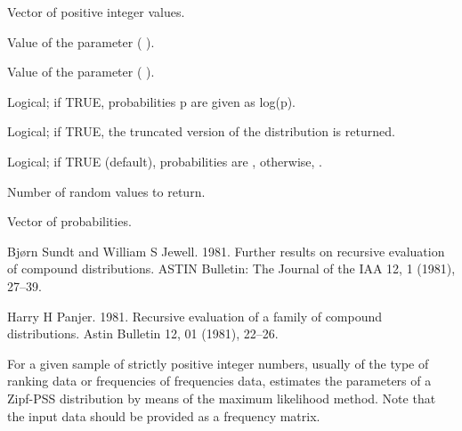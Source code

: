 \documentclass[letterpaper]{book}
\begin{document}
%
\begin{Arguments}
\begin{ldescription}
\item[\code{x, q}] Vector of positive integer values.

\item[\code{alpha}] Value of the \eqn{\alpha}{} parameter ( ).

\item[\code{lambda}] Value of the \eqn{\lambda}{} parameter ( ).

\item[\code{log, log.p}] Logical; if TRUE, probabilities p are given as log(p).

\item[\code{isTruncated}] Logical; if TRUE, the truncated version of the distribution is returned.

\item[\code{lower.tail}] Logical; if TRUE (default), probabilities are , otherwise, .

\item[\code{n}] Number of random values to return.

\item[\code{p}] Vector of probabilities.
\end{ldescription}
\end{Arguments}
%
\begin{References}\relax

Bjørn Sundt and William S Jewell. 1981. Further results on recursive evaluation of compound distributions. ASTIN
Bulletin: The Journal of the IAA 12, 1 (1981), 27–39.

Harry H Panjer. 1981. Recursive evaluation of a family of compound distributions. Astin Bulletin 12, 01 (1981), 22–26.

\end{References}
%
\begin{Description}\relax
For a given sample of strictly positive integer numbers,  usually of the type of ranking data or
frequencies of frequencies data, estimates the parameters of a Zipf-PSS distribution by means of
the maximum likelihood method. Note that the input data should be provided as a frequency matrix.
\end{Description}
\end{document}
